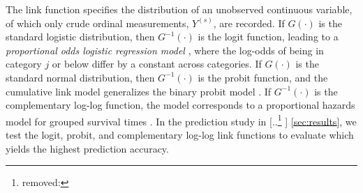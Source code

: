\documentclass{article}
\providecommand{\DIFadd}[1]{{\protect\color{blue} \sf #1}} %
\providecommand{\DIFdel}[1]{{\protect\color{red} [..\footnote{removed: #1} ]}} %
\providecommand{\DIFaddbegin}{} %
\providecommand{\DIFaddend}{} %
\providecommand{\DIFdelbegin}{} %
\providecommand{\DIFdelend}{} %
\begin{document}
The link function specifies the distribution of an unobserved continuous variable, of which only crude ordinal measurements, $Y^{(s)}$, are recorded. If $G(\cdot)$ is the standard logistic distribution, then $G^{-1}(\cdot)$ is the logit function, leading to a \textit{proportional odds logistic regression model} \citep{mccullagh1980a}, where the log-odds of being in category $j$ or below differ by a constant across categories.
If $G(\cdot)$ is the standard normal distribution, then $G^{-1}(\cdot)$ is the probit function, and the cumulative link model generalizes the binary probit model \citep{agresti2012}.
If $G^{-1}(\cdot)$ is the complementary log-log function, the model corresponds to a proportional hazards model for grouped survival times \citep{Christensen2023}.
In the prediction study in \DIFdelbegin \DIFdel{}\DIFdelend \DIFaddbegin \DIFadd{\cref{sec:results}}\DIFaddend , we test the logit, probit, and complementary log-log link functions to evaluate which yields the highest prediction accuracy.
\end{document}
